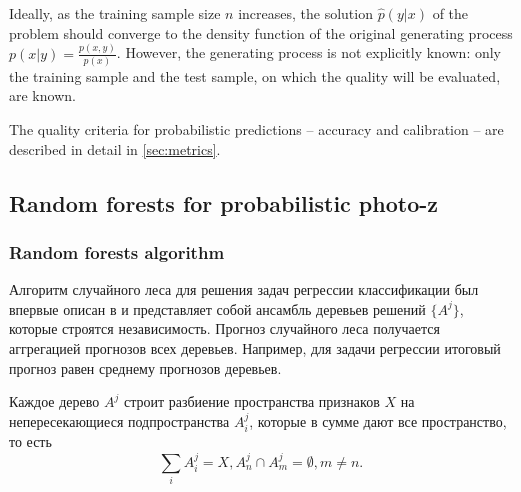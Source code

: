 \documentclass[fleqn,usenatbib]{mnras}
\begin{document}
Ideally, as the training sample size \(n\) increases, the solution \(\hat{p}(y|x)\) of the problem should converge to the density function of the original generating process \(p(x|y) = \frac{p(x,y)}{p(x)}\). However, the generating process is not explicitly known: only the training sample and the test sample, on which the quality will be evaluated, are known.

The quality criteria for probabilistic predictions -- accuracy and calibration -- are described in detail in \ref{sec:metrics}.

\subsection{Random forests for probabilistic photo-z}

\subsubsection{Random forests algorithm}
Алгоритм случайного леса для решения задач регрессии классификации был впервые описан в \citep{2001MachL..45....5B} и представляет собой ансамбль деревьев решений $\{A^j\}$, которые строятся независимость. Прогноз случайного леса получается аггрегацией прогнозов всех деревьев. Например, для задачи регрессии итоговый прогноз равен среднему прогнозов деревьев.

Каждое дерево $A^j$ строит разбиение пространства признаков $X$ на непересекающиеся подпространства $A^j_i$, которые в сумме дают все пространство, то есть
\begin{equation}
    \sum_i A^j_i = X, A^j_n \cap A^j_m = \emptyset, m \neq n.
\end{equation}
\end{document}
